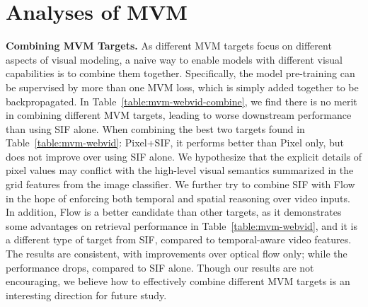 \documentclass[10pt,twocolumn,letterpaper]{article}
\begin{document}
\section{Analyses of MVM}
\noindent \textbf{Combining MVM Targets.} As different MVM targets focus on different aspects of visual modeling, a naive way to enable models with different visual capabilities is to combine them together. Specifically, the model pre-training can be supervised by more than one MVM loss, which is simply added together to be backpropagated. In Table~\ref{table:mvm-webvid-combine}, we find there is no merit in combining different MVM targets, leading to worse downstream performance than using SIF alone. When combining the best two targets found in Table~\ref{table:mvm-webvid}: Pixel+SIF, it performs better than Pixel only, but does not improve over using SIF alone. We hypothesize that the explicit details of pixel values may conflict with the high-level visual semantics summarized in the grid features from the image classifier. We further try to combine SIF with Flow in the hope of enforcing both temporal and spatial reasoning over video inputs. In addition, Flow is a better candidate than other targets, as it demonstrates some advantages on retrieval performance in Table~\ref{table:mvm-webvid}, and it is a different type of target from SIF, compared to temporal-aware video features.
The results are consistent, with improvements over optical flow only; while the performance drops, compared to SIF alone. Though our results are not encouraging, we believe how to effectively combine different MVM targets is an interesting direction for future study. 
\end{document}
